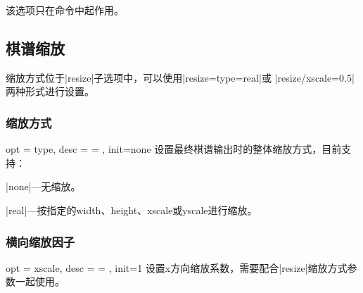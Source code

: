 \documentclass[full]{l3doc}
\begin{document}
\begin{documentation}
  该选项只在命令中起作用。

\begin{SideBySideExample}[frame=single,numbers=left,
                xrightmargin=.45\linewidth,gobble=2]
  \centering
    \begin{setcchessman*}[man/label=test]
       
       
       
       
    \end{setcchessman*}
    \begin{flushleft}
      \small
    \end{flushleft}
\end{SideBySideExample}

\subsection{棋谱缩放}

缩放方式位于|resize|子选项中，可以使用|resize={type=real}|或
|resize/xscale=0.5|两种形式进行设置。

\subsubsection{缩放方式}

\begin{option}{ opt = type, desc = {= }, init=none }
  设置最终棋谱输出时的整体缩放方式，目前支持：
\end{option}

  \begin{Description}[a]
    \item |none|---无缩放。
    \item |real|---按指定的width、height、xscale或yscale进行缩放。
  \end{Description}

\bigskip

\subsubsection{横向缩放因子}

\begin{option}{ opt = xscale, desc = {= }, init=1 }
  设置x方向缩放系数，需要配合|resize|缩放方式参数一起使用。
\end{option}


\end{documentation}
\end{document}
